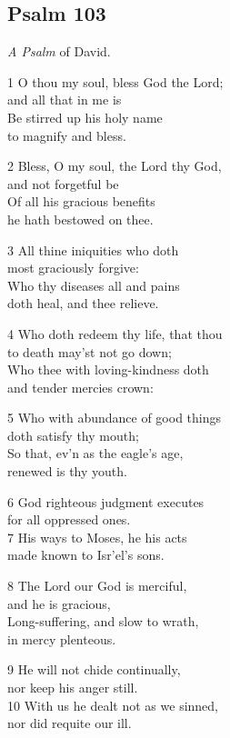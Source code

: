 \begin{center}
\quad{}\quad{}
\end{center}

\subsection*{Psalm 103}

\emph{A Psalm} of David.


1 O thou my soul, bless God the Lord;\\
and all that in me is\\
Be stirred up his holy name\\
to magnify and bless.

2 Bless, O my soul, the Lord thy God,\\
and not forgetful be\\
Of all his gracious benefits\\
he hath bestowed on thee.

3 All thine iniquities who doth\\
most graciously forgive:\\
Who thy diseases all and pains\\
doth heal, and thee relieve.

4 Who doth redeem thy life, that thou\\
to death may’st not go down;\\
Who thee with loving-kindness doth\\
and tender mercies crown:

5 Who with abundance of good things\\
doth satisfy thy mouth;\\
So that, ev’n as the eagle’s age,\\
renewed is thy youth.

6 God righteous judgment executes\\
for all oppressed ones.\\
7 His ways to Moses, he his acts\\
made known to Isr’el’s sons.

8 The Lord our God is merciful,\\
and he is gracious,\\
Long-suffering, and slow to wrath,\\
in mercy plenteous.

9 He will not chide continually,\\
nor keep his anger still.\\
10 With us he dealt not as we sinned,\\
nor did requite our ill.

